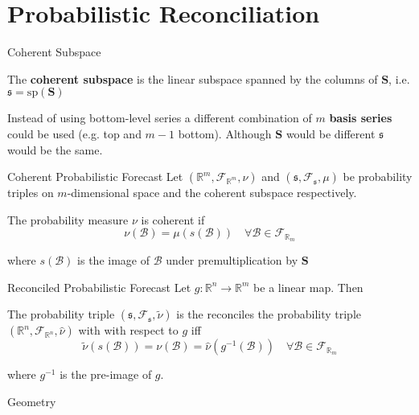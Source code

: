 \documentclass{beamer}
\begin{document}
  \section{Probabilistic Reconciliation}
  \begin{frame}{Coherent Subspace}
  	\begin{definition} 
  		The {\bf coherent subspace} is the linear subspace spanned by the columns of ${\bm S}$, i.e. $\mathfrak{s}=\mbox{sp}({\bm S})$
  	\end{definition}
    Instead of using bottom-level series a different combination of $m$ {\bf basis series} could be used (e.g. top and $m-1$ bottom).  Although ${\bm S}$ would be different $\mathfrak{s}$ would be the same.
  \end{frame}
  \begin{frame}{Coherent Probabilistic Forecast}
    Let $(\mathbb{R}^m,\mathcal{F}_{\mathbb{R}^m},\nu)$ and $(\mathfrak{s},\mathcal{F}_{\mathfrak{s}},\mu)$ be probability triples on $m$-dimensional space and the coherent subspace respectively.
    \begin{definition}
      The probability measure $\nu$ is coherent if
      \begin{equation*}
      \nu(\mathcal{B})=\mu(s(\mathcal{B}))\quad\forall\mathcal{B}\in \mathcal{F}_{\mathbb{R}_m}
      \end{equation*} 
    \end{definition}
    where $s(\mathcal{B})$ is the image of $\mathcal{B}$ under premultiplication by ${\bm S}$
  \end{frame}
  \begin{frame}{Reconciled Probabilistic Forecast}
  	Let $g:\mathbb{R}^n\rightarrow\mathbb{R}^m$ be a linear map.  Then 
  	\begin{definition}
  	The probability triple $\left(\mathfrak{s},\mathcal{F}_{\mathfrak{s}},\tilde{\nu}\right)$ is the reconciles the probability triple $\left(\mathbb{R}^n,\mathcal{F}_{\mathbb{R}^n},\hat{\nu}\right)$ with with respect to $g$ iff
  	\begin{equation*}
  	\tilde{\nu}(s(\mathcal{B}))=\nu(\mathcal{B})=\hat{\nu}(g^{-1}(\mathcal{B}))\quad\forall \mathcal{B}\in\mathcal{F}_{\mathbb{R}_m}
  	\end{equation*}
  	\end{definition}
    where $g^{-1}$ is the pre-image of $g$.
  \end{frame}
  \begin{frame}{Geometry}
  	\centering
  	
  \end{frame}
\end{document}
